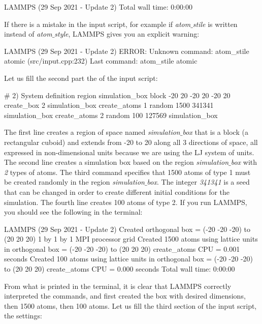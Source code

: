 \begin{lcverbatim}
LAMMPS (29 Sep 2021 - Update 2)
Total wall time: 0:00:00
\end{lcverbatim}

\noindent If there is a mistake in the input script, for example if
\textit{atom$\_$stile} is written instead of \textit{atom$\_$style}, LAMMPS
gives you an explicit warning:

\begin{lcverbatim}
LAMMPS (29 Sep 2021 - Update 2)
ERROR: Unknown command: atom_stile  atomic (src/input.cpp:232)
Last command: atom_stile atomic
\end{lcverbatim}

\noindent Let us fill the second part the of the input script:

\begin{lcverbatim}
# 2) System definition
region simulation_box block -20 20 -20 20 -20 20
create_box 2 simulation_box
create_atoms 1 random 1500 341341 simulation_box
create_atoms 2 random 100 127569 simulation_box
\end{lcverbatim}

\noindent The first line creates a region of space
named \textit{simulation$\_$box} that is a block (a rectangular cuboid) and
extends from -20 to 20 along all 3 directions of space, all expressed in
non-dimensional units because we are using the LJ system
of units. The second line creates a simulation box based on
the region \textit{simulation$\_$box} with \textit{2} types of atoms. The third
command specifies that 1500 atoms of type 1 must be created
randomly in the region \textit{simulation$\_$box}. The integer \textit{341341} is a
seed that can be changed in order to create different
initial conditions for the simulation. The fourth line
creates 100 atoms of type 2.
If you run LAMMPS, you should see the following in the
terminal:

\begin{lcverbatim}
LAMMPS (29 Sep 2021 - Update 2)
Created orthogonal box = (-20 -20 -20) to (20 20 20)
1 by 1 by 1 MPI processor grid
Created 1500 atoms
using lattice units in orthogonal box = (-20 -20 -20) to (20 20 20)
create_atoms CPU = 0.001 seconds
Created 100 atoms
using lattice units in orthogonal box = (-20 -20 -20) to (20 20 20)
create_atoms CPU = 0.000 seconds
Total wall time: 0:00:00
\end{lcverbatim}

\noindent From what is printed in the terminal, it is clear that
LAMMPS correctly interpreted the commands, and first created
the box with desired dimensions, then 1500 atoms, then 100
atoms.
Let us fill the third section of the input script, the settings:

